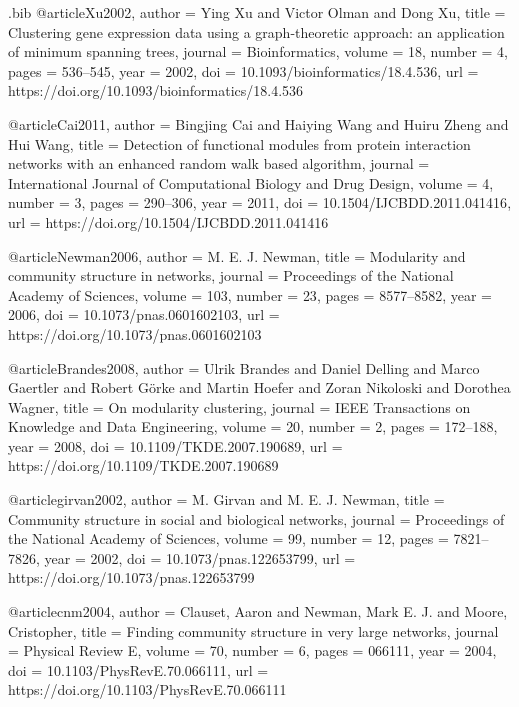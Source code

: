 \documentclass[11pt,a4paper]{article}
\begin{document}
\begin{filecontents*}[overwrite]{\jobname.bib}
@article{Xu2002,
  author    = {Ying Xu and Victor Olman and Dong Xu},
  title     = {Clustering gene expression data using a graph-theoretic approach: an application of minimum spanning trees},
  journal   = {Bioinformatics},
  volume    = {18},
  number    = {4},
  pages     = {536--545},
  year      = {2002},
  doi       = {10.1093/bioinformatics/18.4.536},
  url       = {https://doi.org/10.1093/bioinformatics/18.4.536}
}

@article{Cai2011,
  author    = {Bingjing Cai and Haiying Wang and Huiru Zheng and Hui Wang},
  title     = {Detection of functional modules from protein interaction networks with an enhanced random walk based algorithm},
  journal   = {International Journal of Computational Biology and Drug Design},
  volume    = {4},
  number    = {3},
  pages     = {290--306},
  year      = {2011},
  doi       = {10.1504/IJCBDD.2011.041416},
  url       = {https://doi.org/10.1504/IJCBDD.2011.041416}
}

@article{Newman2006,
  author   = {M. E. J. Newman},
  title    = {Modularity and community structure in networks},
  journal  = {Proceedings of the National Academy of Sciences},
  volume   = {103},
  number   = {23},
  pages    = {8577--8582},
  year     = {2006},
  doi      = {10.1073/pnas.0601602103},
  url      = {https://doi.org/10.1073/pnas.0601602103}
}

@article{Brandes2008,
  author    = {Ulrik Brandes and Daniel Delling and Marco Gaertler and Robert G{\"o}rke and Martin Hoefer and Zoran Nikoloski and Dorothea Wagner},
  title     = {On modularity clustering},
  journal   = {IEEE Transactions on Knowledge and Data Engineering},
  volume    = {20},
  number    = {2},
  pages     = {172--188},
  year      = {2008},
  doi       = {10.1109/TKDE.2007.190689},
  url       = {https://doi.org/10.1109/TKDE.2007.190689}
}

@article{girvan2002,
  author   = {M. Girvan and M. E. J. Newman},
  title    = {Community structure in social and biological networks},
  journal  = {Proceedings of the National Academy of Sciences},
  volume   = {99},
  number   = {12},
  pages    = {7821--7826},
  year     = {2002},
  doi      = {10.1073/pnas.122653799},
  url      = {https://doi.org/10.1073/pnas.122653799}
}

@article{cnm2004,
  author  = {Clauset, Aaron and Newman, Mark E. J. and Moore, Cristopher},
  title   = {Finding community structure in very large networks},
  journal = {Physical Review E},
  volume  = {70},
  number  = {6},
  pages   = {066111},
  year    = {2004},
  doi     = {10.1103/PhysRevE.70.066111},
  url     = {https://doi.org/10.1103/PhysRevE.70.066111}
}


\end{filecontents*}
\end{document}
